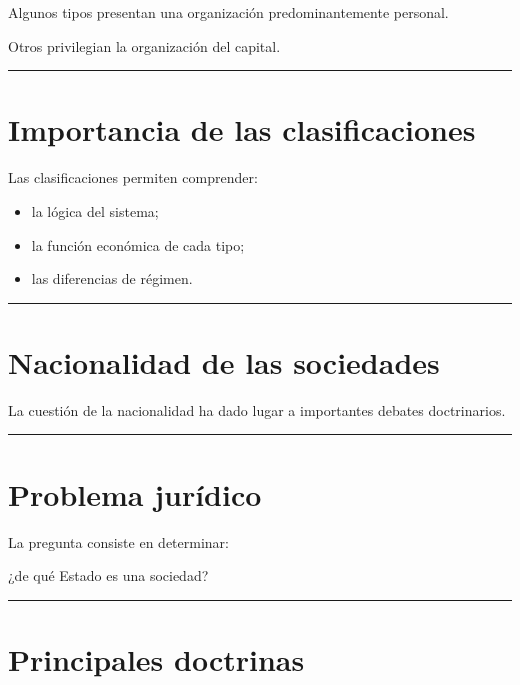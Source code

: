 \documentclass[
  spanish,
  letterpaper,
  DIV=11,
  numbers=noendperiod]{scrartcl}
\providecommand{\tightlist}{%
  \setlength{\itemsep}{0pt}\setlength{\parskip}{0pt}}
\begin{document}
Algunos tipos presentan una organización predominantemente personal.

Otros privilegian la organización del capital.

\begin{center}\rule{0.5\linewidth}{0.5pt}\end{center}

\section{Importancia de las
clasificaciones}\label{importancia-de-las-clasificaciones}

Las clasificaciones permiten comprender:

\begin{itemize}
\tightlist
\item
  la lógica del sistema;
\item
  la función económica de cada tipo;
\item
  las diferencias de régimen.
\end{itemize}

\begin{center}\rule{0.5\linewidth}{0.5pt}\end{center}

\section{Nacionalidad de las
sociedades}\label{nacionalidad-de-las-sociedades}

La cuestión de la nacionalidad ha dado lugar a importantes debates
doctrinarios.

\begin{center}\rule{0.5\linewidth}{0.5pt}\end{center}

\section{Problema jurídico}\label{problema-juruxeddico}

La pregunta consiste en determinar:

¿de qué Estado es una sociedad?

\begin{center}\rule{0.5\linewidth}{0.5pt}\end{center}

\section{Principales doctrinas}\label{principales-doctrinas}
\end{document}

